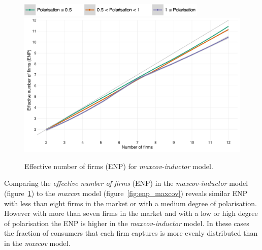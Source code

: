 \documentclass[preprint, 12pt]{elsarticle}
\begin{document}
\begin{figure}[ht!]
	\centering
	\includegraphics[width=90mm]{Graphics/legend_pol.pdf}
	\includegraphics[width=\textwidth]{Graphics/fig612a.pdf}
	\caption{Effective number of firms (ENP) for \emph{maxcov-inductor} model.}
	\label{fig:enp_mi}
\end{figure}

Comparing the \emph{effective number of firms} (ENP) in the \emph{maxcov-inductor} model (figure~\ref{fig:enp_mi}) to the \emph{maxcov} model (figure~\ref{fig:enp_maxcov})  reveals similar ENP with less than eight firms in the market or with a medium degree of polarisation. However with more than seven firms in the market and with a low or high degree of polarisation the ENP is higher in the \emph{maxcov-inductor} model. In these cases the fraction of consumers that each firm captures is more evenly distributed than in the \emph{maxcov} model. 
\end{document}

